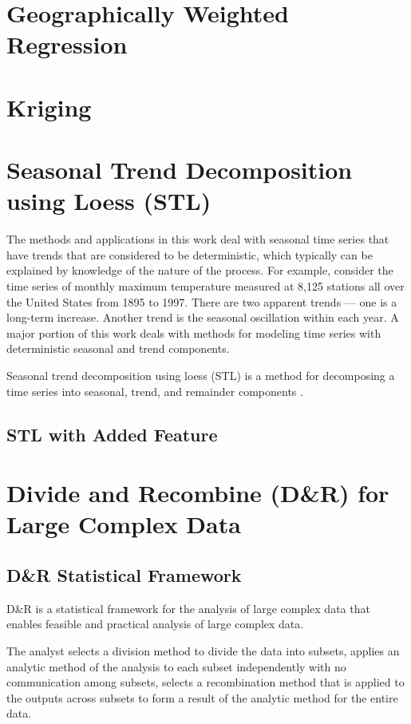 \section{Geographically Weighted Regression}

\section{Kriging}

\section{Seasonal Trend Decomposition using Loess (STL)}
\label{sec:stl}
The methods and applications in this work deal with seasonal time series
that have trends that are considered to be deterministic, which typically can be
explained by knowledge of the nature of the process. For example, consider the
time series of monthly maximum temperature measured at 8,125 stations all over 
the United States from 1895 to 1997. There are two apparent trends --- one is a
long-term increase. Another trend is the seasonal oscillation within each year.
A major portion of this work deals with methods for modeling time series with
deterministic seasonal and trend components.

Seasonal trend decomposition using loess (STL) is a method for decomposing a time
series into seasonal, trend, and remainder components \cite{Cleveland:1990}.

\subsection{STL with Added Feature}

\section{Divide and Recombine (D\&R) for Large Complex Data}

\subsection{D\&R Statistical Framework}

D\&R \cite{Guha:2012} is a statistical framework for the analysis of large complex
data that enables feasible and practical analysis of large complex data. 

The 
analyst selects a division method to divide the data into subsets, applies an 
analytic method of the analysis to each subset independently with no communication
among subsets, selects a recombination method that is applied to the outputs 
across subsets to form a result of the analytic method for the entire data.

